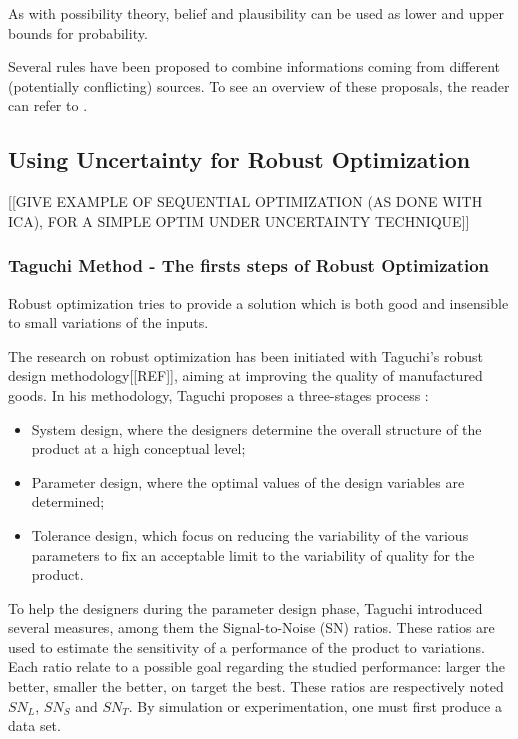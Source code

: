As with possibility theory, belief and plausibility can be used as lower and upper bounds for probability.

Several rules have been proposed to combine informations coming from different (potentially conflicting) sources. To see an overview of these proposals, the reader can refer to \cite{sentz2002combination}.

\subsection{Using Uncertainty for Robust Optimization}

[[GIVE EXAMPLE OF SEQUENTIAL OPTIMIZATION (AS DONE WITH ICA), FOR A SIMPLE OPTIM UNDER UNCERTAINTY TECHNIQUE]]

\subsubsection{Taguchi Method - The firsts steps of Robust Optimization }

Robust optimization tries to provide a solution which is both good and insensible to small variations of the inputs.

The research on robust optimization has been initiated with Taguchi's robust design methodology[[REF]], aiming at improving the quality of manufactured goods.
In his methodology, Taguchi proposes a three-stages process :
\begin{itemize}
\item System design, where the designers determine the overall structure of the product at a high conceptual level;
\item Parameter design, where the optimal values of the design variables are determined;
\item Tolerance design, which focus on reducing the variability of the  various parameters to fix an acceptable limit to the variability of quality for the product.
\end{itemize}

To help the designers during the parameter design phase, Taguchi introduced several measures, among them the Signal-to-Noise (SN) ratios. These ratios are used to estimate the sensitivity of a performance of the product to variations. Each ratio relate to a possible goal regarding the studied performance: larger the better, smaller the better, on target the best. These ratios are respectively noted $SN_L$, $SN_S$ and $SN_T$.
By simulation or experimentation, one must first produce a data set.

